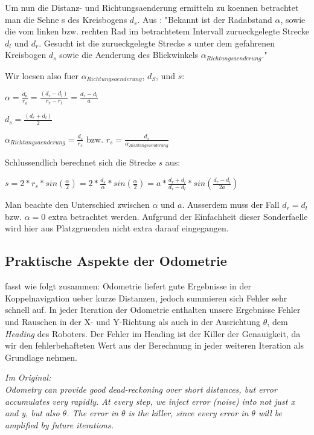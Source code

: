 \documentclass[11pt,a4paper]{article}
\begin{document}
Um nun die Distanz- und Richtungsaenderung ermitteln zu koennen betrachtet man die Sehne s des Kreisbogens $d_s$. Aus \cite{website:dresden}:
"Bekannt ist der Radabstand $\alpha$, sowie die vom linken bzw. rechten Rad im betrachtetem Intervall zurueckgelegte Strecke $d_l$ und $d_r$. Gesucht 
ist die zurueckgelegte Strecke $s$ unter dem gefahrenen Kreisbogen $d_s$ sowie die Aenderung des Blickwinkels $\alpha_{Richtungsaenderung}$."

Wir loesen also fuer $\alpha_{Richtungsaenderung}$, $d_S$, und $s$: 

$\alpha = \frac{d_a}{r_a} = \frac{(d_r - d_l)}{r_r - r_l} = \frac{d_r - d_l}{a}$

$d_s = \frac{(d_r + d_l)}{2}$

$\alpha_{Richtungsaenderung} =  \frac{d_s}{r_s}$ bzw. $r_s = \frac{d_s}{\alpha_{Richtungsaenderung}}$

Schlussendlich berechnet sich die Strecke $s$ aus:

$s = 2 * r_s * sin(\frac{\alpha}{2}) = 2 * \frac{d_s}{\alpha}* sin(\frac{\alpha}{2}) = a * \frac{d_r + d_l}{d_r - d_l} * sin(\frac{d_r - d_l}{2a})$

Man beachte den Unterschied zwischen $\alpha$ und $a$. Ausserdem muss der Fall $d_r = d_l$ bzw. $\alpha = 0$ extra betrachtet werden. Aufgrund der Einfachheit 
dieser Sonderfaelle wird hier aus Platzgruenden nicht extra darauf eingegangen.

\subsection*{Praktische Aspekte der Odometrie}

\cite{olson2004primer} fasst wie folgt zusammen:
Odometrie liefert gute Ergebnisse in der Koppelnavigation ueber kurze Distanzen, jedoch summieren sich Fehler sehr schnell auf.
In jeder Iteration der Odometrie enthalten unsere Ergebnisse Fehler und Rauschen in der X- und Y-Richtung als auch in der Ausrichtung $\theta$, dem \textit{Heading}
des Roboters. Der Fehler im Heading ist der Killer der Genauigkeit, da wir den fehlerbehafteten Wert aus der Berechnung in jeder weiteren Iteration als Grundlage nehmen.

\textit{Im Original: \\
Odometry can provide good dead-reckoning over short distances, but error accumulates very
rapidly. At every step, we inject error (noise) into not just x and y, but also $\theta$. The error
in $\theta$ is the killer, since every error in $\theta$ will be amplified by future iterations.} \vspace{5mm} \\
\end{document}
